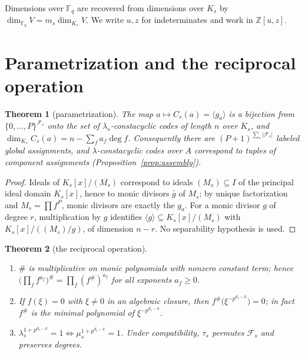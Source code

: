\documentclass[10pt,journal,draftclsnofoot,onecolumn]{IEEEtran}
\newtheorem{theorem}{Theorem}[section]
\theoremstyle{definition}
\theoremstyle{remark}
\newcommand{\Fq}{\mathbb{F}_q}
\newcommand{\Z}{\mathbb{Z}}
\begin{document}
Dimensions over \(\Fq\) are recovered from dimensions over \(K_s\) by
\(\dim_{\Fq} V = m_s \dim_{K_s} V\). We write \(u, z\) for indeterminates
and work in \(\Z[u,z]\).

\section{Parametrization and the reciprocal operation}\label{sec:param}

\begin{theorem}[parametrization]\label{thm:T1}
The map \(a \mapsto C_s(a) = \langle g_a \rangle\) is a bijection from
\(\{0,\dots,P\}^{\mathcal{F}_s}\) onto the set of \(\lambda_s\)-constacyclic
codes of length \(n\) over \(K_s\), and
\(\dim_{K_s} C_s(a) = n - \sum_{f} a_f \deg f\).
Consequently there are \((P+1)^{\sum_s |\mathcal{F}_s|}\) labeled global
assignments, and \(\lambda\)-constacyclic codes over \(A\) correspond to tuples
of component assignments (Proposition~\ref{prop:assembly}).
\end{theorem}

\begin{proof}
Ideals of \(K_s[x]/(M_s)\) correspond to ideals \((M_s) \subseteq I\) of
the principal ideal domain \(K_s[x]\), hence to monic divisors
\(\bar g\) of \(M_s\); by unique factorization and \(M_s =
\prod f^P\), monic divisors are exactly the \(g_a\). For a monic divisor
\(g\) of degree \(r\), multiplication by \(g\) identifies
\(\langle g \rangle \subseteq K_s[x]/(M_s)\) with
\(K_s[x]/((M_s)/g)\), of dimension \(n - r\). No separability hypothesis
is used.
\end{proof}

\begin{theorem}[the reciprocal operation]\label{thm:T2}
\begin{enumerate}
\item[(i)] \(\#\) is multiplicative on monic polynomials with nonzero
constant term; hence
\(\big(\prod_f f^{a_f}\big)^{\#} = \prod_f (f^{\#})^{a_f}\) for all
exponents \(a_f \ge 0\).
\item[(ii)] If \(f(\xi) = 0\) with \(\xi \ne 0\) in an algebraic
closure, then \(f^{\#}\big(\xi^{-p^{d_s-k}}\big) = 0\); in fact
\(f^{\#}\) is the minimal polynomial of \(\xi^{-p^{d_s-k}}\).
\item[(iii)] \(\lambda_s^{1+p^{d_s-k}} = 1 \iff
\mu_s^{1+p^{d_s-k}} = 1\). Under compatibility, \(\tau_s\) permutes
\(\mathcal{F}_s\) and preserves degrees.
\end{enumerate}
\end{theorem}
\end{document}
